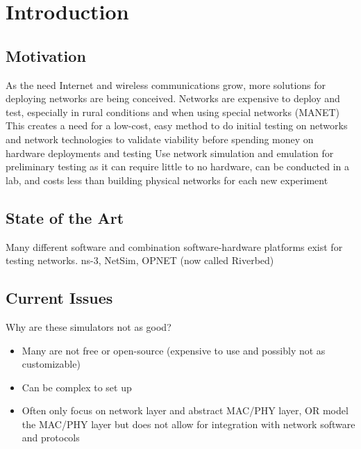 \chapter{Introduction}
\label{ch:introduction}
\section{Motivation}
As the need Internet and wireless communications grow, more solutions for deploying networks are being conceived. 
Networks are expensive to deploy and test, especially in rural conditions and when using special networks (MANET) %
This creates a need for a low-cost, easy method to do initial testing on networks and network technologies to validate viability before spending money on hardware deployments and testing
Use network simulation and emulation for preliminary testing as it can require little to no hardware, can be conducted in a lab, and costs less than building physical networks for each new experiment


\section{State of the Art}
Many different software and combination software-hardware platforms exist for testing networks.
ns-3, NetSim, OPNET (now called Riverbed)


\section{Current Issues}
Why are these simulators not as good?
\begin{itemize}
    \item Many are not free or open-source (expensive to use and possibly not as customizable) %
    \item Can be complex to set up %
    \item Often only focus on network layer and abstract MAC/PHY layer, OR model the MAC/PHY layer but does not allow for integration with network software and protocols %
\end{itemize}


